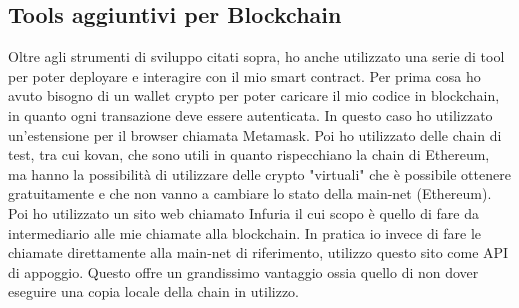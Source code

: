     \subsection{Tools aggiuntivi per Blockchain}
    Oltre agli strumenti di sviluppo citati sopra, ho anche utilizzato una serie di tool per poter deployare e interagire con il mio smart contract.
    Per prima cosa ho avuto bisogno di un wallet crypto per poter caricare il mio codice in blockchain, in quanto ogni transazione deve essere autenticata. In questo caso ho utilizzato un'estensione per il browser chiamata Metamask. Poi ho utilizzato delle chain di test, tra cui kovan, che sono utili in quanto rispecchiano la chain di Ethereum, ma hanno la possibilità di utilizzare delle crypto "virtuali" che è possibile ottenere gratuitamente e che non vanno a cambiare lo stato della main-net (Ethereum).
    Poi ho utilizzato un sito web chiamato Infuria il cui scopo è quello di fare da intermediario alle mie chiamate alla blockchain. In pratica io invece di fare le chiamate direttamente alla main-net di riferimento, utilizzo questo sito come API di appoggio. Questo offre un grandissimo vantaggio ossia quello di non dover eseguire una copia locale della chain in utilizzo.